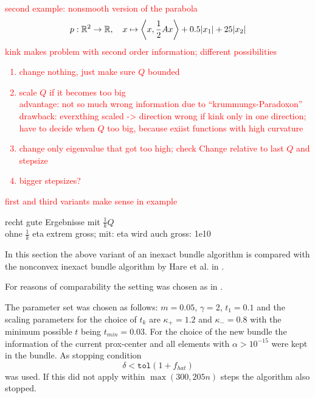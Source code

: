 \textcolor{red}{second example: nonsmooth version of the parabola
	\[ p: \mathbb{R}^2 \to \mathbb{R}, \quad x \mapsto \left\langle x, \frac{1}{2}Ax\right\rangle + 0.5 |x_1|+25|x_2|\]
	kink makes problem with second order information; different possibilities\\
	\begin{enumerate}
		\item change nothing, just make sure \(Q\) bounded
		\item scale \(Q\) if it becomes too big \\
		advantage: not so much wrong information due to ``krummungs-Paradoxon''\\
		drawback: everxthing scaled -> direction wrong if kink only in one direction; have to decide when \(Q\) too big, because exiist functions with high curvature
		\item change only eigenvalue that got too high; check Change relative to last \(Q\) and stepsize
		\item bigger stepsizes?
	\end{enumerate}
	first and third variants make sense in example}


recht gute Ergebnisse mit \(\frac{1}{k}Q\)\\
ohne \(\frac{1}{k}\) eta extrem gross; mit: eta wird auch gross: 1e10

In this section the above variant of an inexact bundle algorithm is compared with the nonconvex inexact bundle algorithm by Hare et al. in \cite{Hare2016}.

For reasons of comparability the setting was chosen as in \cite{Hare2016}.

The parameter set was chosen as follows: \(m = 0.05\), \(\gamma = 2\), \(t_1 = 0.1\) and the scaling parameters for the choice of \(t_k\) are \(\kappa_{+}=1.2\) and \(\kappa_{-}=0.8\) with the minimum possible \(t\) being \(t_{min}=0.03\).
For the choice of the new bundle the information of the current prox-center and all elements with \(\alpha > 10^{-15}\) were kept in the bundle.
As stopping condition  
\[ \delta < \mathtt{tol}(1+f_{hat}) \]
was used.
If this did not apply within \(\max(300,205n)\) steps the algorithm also stopped.

